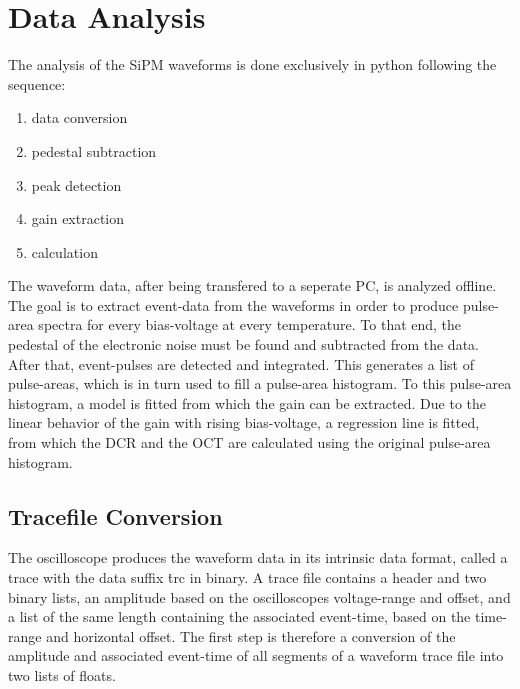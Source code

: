 \documentclass[12pt,article,type=msc,colorback,accentcolor=tud9c]{tudthesis}
\begin{document}
\section{\Large Data Analysis}
The analysis of the SiPM waveforms is done exclusively in python following the sequence:\\
\begin{enumerate}[topsep=0pt,itemsep=-1ex,partopsep=1ex,parsep=1ex]
\item data conversion
\item pedestal subtraction
\item peak detection
\item gain extraction
\item calculation
\end{enumerate}
The waveform data, after being transfered to a seperate PC, is analyzed offline. The goal is to extract event-data from the waveforms in order to produce pulse-area spectra for every bias-voltage at every temperature. To that end, the pedestal of the electronic noise must be found and subtracted from the data. After that, event-pulses are detected and integrated. This generates a list of pulse-areas, which is in turn used to fill a pulse-area histogram. To this pulse-area histogram, a model is fitted from which the gain can be extracted. Due to the linear behavior of the gain with rising bias-voltage, a regression line is fitted, from which the DCR and the OCT are calculated using the original pulse-area histogram.
\subsection{Tracefile Conversion}
The oscilloscope produces the waveform data in its intrinsic data format, called a trace with the data suffix \.trc in binary. A trace file contains a header and two binary lists, an amplitude based on the oscilloscopes voltage-range and offset, and a list of the same length containing the associated event-time, based on the time-range and horizontal offset. The first step is therefore a conversion of the amplitude and associated event-time of all segments of a waveform trace file into two lists of floats. 
\clearpage
\end{document}
